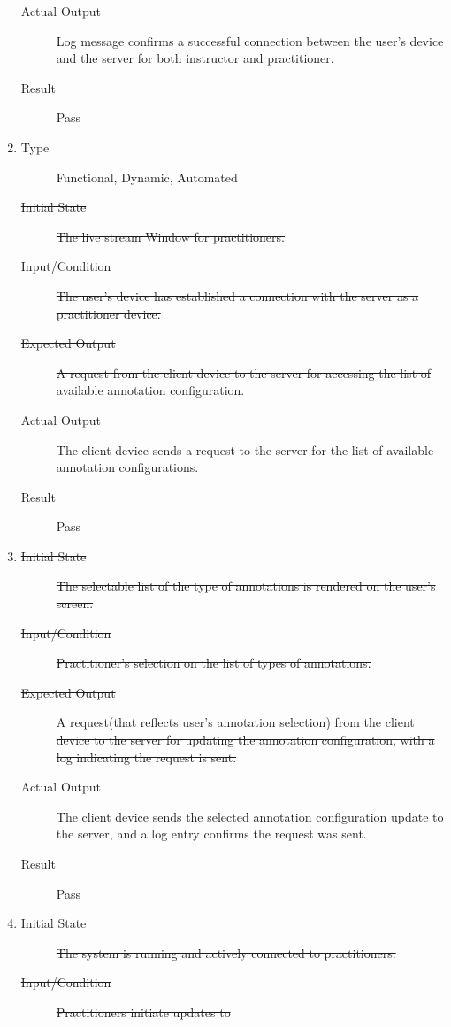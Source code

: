\documentclass[12pt, titlepage]{article}
\begin{document}
\begin{enumerate}[FR-T1]
\begin{description}
  \item[Actual Output] Log message confirms a successful connection between the
    user’s device and the server for both instructor and practitioner.
  \item[Result] Pass
  \end{description}
\item \label{FRT4}
  \begin{description}
  \item[Type] Functional, Dynamic, Automated
  \item[\sout{Initial State}] \sout{The live stream Window for practitioners.}
  \item[\sout{Input/Condition}] \sout{The user’s device has established a
      connection with the server as a practitioner device.}
  \item[\sout{Expected Output}] \sout{A request from the client device to the server for
      accessing the list of available annotation configuration.}
  \item[Actual Output] The client device sends a request to the server for the
    list of available annotation configurations.
  \item[Result] Pass
  \end{description}
\item \label{FRT5}
  \begin{description}
  \item[\sout{Initial State}] \sout{The selectable list of the type of
      annotations is rendered on the user's screen.}
  \item[\sout{Input/Condition}] \sout{Practitioner’s selection on the list of
      types of annotations.}
  \item[\sout{Expected Output}] \sout{A request(that reflects user’s annotation
      selection) from the client device to the server for updating the
      annotation configuration, with a log indicating the request is sent.}
  \item[Actual Output] The client device sends the selected annotation
    configuration update to the server, and a log entry confirms the request
    was sent.
  \item[Result] Pass
  \end{description}
\item \label{FRT6}
  \begin{description}
  \item[\sout{Initial State}] \sout{The system is running and actively connected
      to practitioners.}
  \item[\sout{Input/Condition}] \sout{Practitioners initiate updates to
}
\end{description}
\end{enumerate}
\end{document}
